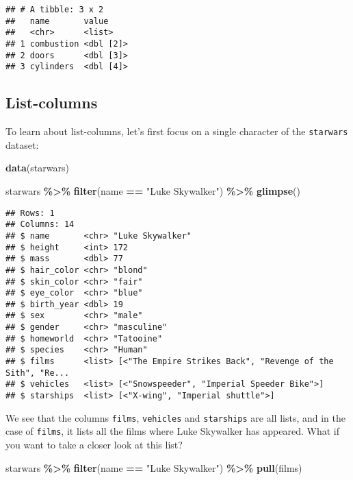 \documentclass[
]{article}
\newenvironment{Shaded}{\begin{snugshade}}{\end{snugshade}}
\newcommand{\KeywordTok}[1]{\textcolor[rgb]{0.13,0.29,0.53}{\textbf{#1}}}
\newcommand{\NormalTok}[1]{#1}
\newcommand{\OperatorTok}[1]{\textcolor[rgb]{0.81,0.36,0.00}{\textbf{#1}}}
\newcommand{\StringTok}[1]{\textcolor[rgb]{0.31,0.60,0.02}{#1}}
\begin{document}
\begin{verbatim}
## # A tibble: 3 x 2
##   name       value    
##   <chr>      <list>   
## 1 combustion <dbl [2]>
## 2 doors      <dbl [3]>
## 3 cylinders  <dbl [4]>
\end{verbatim}

\hypertarget{list-columns}{%
\subsection{List-columns}\label{list-columns}}

To learn about list-columns, let's first focus on a single character of the \texttt{starwars} dataset:

\begin{Shaded}
\begin{Highlighting}[]
\KeywordTok{data}\NormalTok{(starwars)}
\end{Highlighting}
\end{Shaded}

\begin{Shaded}
\begin{Highlighting}[]
\NormalTok{starwars }\OperatorTok{\%\textgreater{}\%}
\StringTok{  }\KeywordTok{filter}\NormalTok{(name }\OperatorTok{==}\StringTok{ "Luke Skywalker"}\NormalTok{) }\OperatorTok{\%\textgreater{}\%}
\StringTok{  }\KeywordTok{glimpse}\NormalTok{()}
\end{Highlighting}
\end{Shaded}

\begin{verbatim}
## Rows: 1
## Columns: 14
## $ name       <chr> "Luke Skywalker"
## $ height     <int> 172
## $ mass       <dbl> 77
## $ hair_color <chr> "blond"
## $ skin_color <chr> "fair"
## $ eye_color  <chr> "blue"
## $ birth_year <dbl> 19
## $ sex        <chr> "male"
## $ gender     <chr> "masculine"
## $ homeworld  <chr> "Tatooine"
## $ species    <chr> "Human"
## $ films      <list> [<"The Empire Strikes Back", "Revenge of the Sith", "Re...
## $ vehicles   <list> [<"Snowspeeder", "Imperial Speeder Bike">]
## $ starships  <list> [<"X-wing", "Imperial shuttle">]
\end{verbatim}

We see that the columns \texttt{films}, \texttt{vehicles} and \texttt{starships} are all lists, and in the case of
\texttt{films}, it lists all the films where Luke Skywalker has appeared. What if you want to take a closer look at this list?

\begin{Shaded}
\begin{Highlighting}[]
\NormalTok{starwars }\OperatorTok{\%\textgreater{}\%}
\StringTok{  }\KeywordTok{filter}\NormalTok{(name }\OperatorTok{==}\StringTok{ "Luke Skywalker"}\NormalTok{) }\OperatorTok{\%\textgreater{}\%}
\StringTok{  }\KeywordTok{pull}\NormalTok{(films)}
\end{Highlighting}
\end{Shaded}
\end{document}
